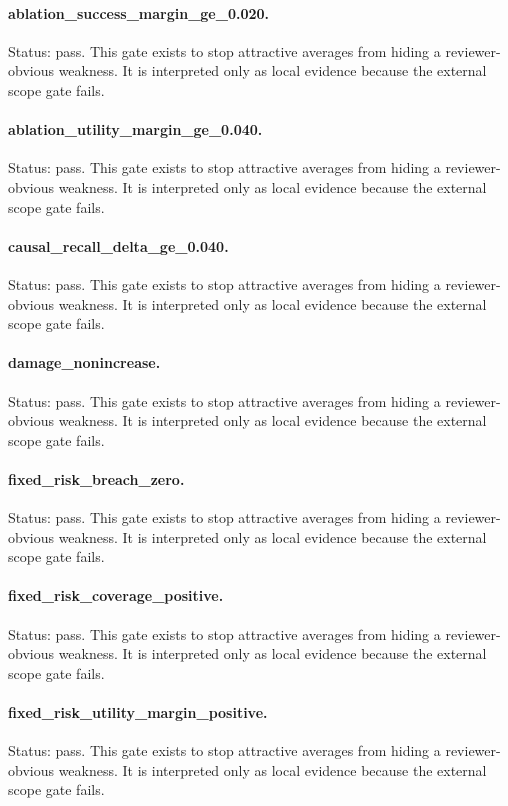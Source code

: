 \documentclass{article}
\begin{document}
\paragraph{ablation\_success\_margin\_ge\_0.020.} Status: pass. This gate exists to stop attractive averages from hiding a reviewer-obvious weakness. It is interpreted only as local evidence because the external scope gate fails.
\paragraph{ablation\_utility\_margin\_ge\_0.040.} Status: pass. This gate exists to stop attractive averages from hiding a reviewer-obvious weakness. It is interpreted only as local evidence because the external scope gate fails.
\paragraph{causal\_recall\_delta\_ge\_0.040.} Status: pass. This gate exists to stop attractive averages from hiding a reviewer-obvious weakness. It is interpreted only as local evidence because the external scope gate fails.
\paragraph{damage\_nonincrease.} Status: pass. This gate exists to stop attractive averages from hiding a reviewer-obvious weakness. It is interpreted only as local evidence because the external scope gate fails.
\paragraph{fixed\_risk\_breach\_zero.} Status: pass. This gate exists to stop attractive averages from hiding a reviewer-obvious weakness. It is interpreted only as local evidence because the external scope gate fails.
\paragraph{fixed\_risk\_coverage\_positive.} Status: pass. This gate exists to stop attractive averages from hiding a reviewer-obvious weakness. It is interpreted only as local evidence because the external scope gate fails.
\paragraph{fixed\_risk\_utility\_margin\_positive.} Status: pass. This gate exists to stop attractive averages from hiding a reviewer-obvious weakness. It is interpreted only as local evidence because the external scope gate fails.
\end{document}
